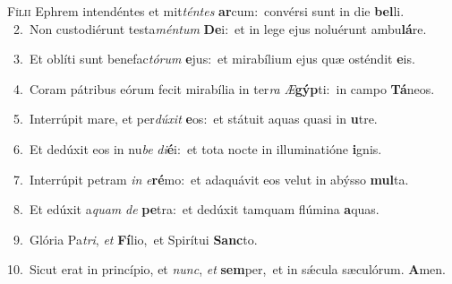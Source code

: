 \lettrine{\initial\textcolor{\initialcolor}{F}}{ílii} Ephrem intendéntes et mit\-\textit{tén}\-\textit{tes} \textbf{ar}\-cum:~\star convérsi sunt in die \textbf{bel}\-li.\\
{\numbfont\textcolor{\numbcolor}{~2.}}~Non custodiérunt testa\-\textit{mén}\-\textit{tum} \textbf{De}\-i:~\star et in lege ejus noluérunt ambu\-\textbf{lá}\-re.\par
{\numbfont\textcolor{\numbcolor}{~3.}}~Et oblíti sunt benefac\-\textit{tó}\-\textit{rum} \textbf{e}\-jus:~\star et mirabílium ejus quæ osténdit \textbf{e}\-is.\par
{\numbfont\textcolor{\numbcolor}{~4.}}~Coram pátribus eórum fecit mirabília in ter\textit{ra} \textit{Æ}\-\textbf{gýp}ti:~\star in campo \textbf{Tá}\-neos.\par
{\numbfont\textcolor{\numbcolor}{~5.}}~Interrúpit mare, et per\-\textit{dú}\-\textit{xit} \textbf{e}\-os:~\star et státuit aquas quasi in \textbf{u}\-tre.\par
{\numbfont\textcolor{\numbcolor}{~6.}}~Et dedúxit eos in nu\textit{be} \textit{di}\-\textbf{é}i:~\star et tota nocte in illuminatióne \textbf{i}\-gnis.\par
{\numbfont\textcolor{\numbcolor}{~7.}}~Interrúpit petram \textit{in} \textit{e}\-\textbf{ré}mo:~\star et adaquávit eos velut in abýsso \textbf{mul}\-ta.\par
{\numbfont\textcolor{\numbcolor}{~8.}}~Et edúxit a\textit{quam} \textit{de} \textbf{pe}\-tra:~\star et dedúxit tamquam flúmina \textbf{a}\-quas.\par
{\numbfont\textcolor{\numbcolor}{~9.}}~Glória Pa\-\textit{tri}\-, \textit{et} \textbf{Fí}\-lio,~\star et Spirítui \textbf{Sanc}\-to.\par
{\numbfont\textcolor{\numbcolor}{10.}}~Sicut erat in princípio, et \textit{nunc}\-, \textit{et} \textbf{sem}\-per,~\star et in sǽcula sæculórum. \textbf{A}\-men.\par
